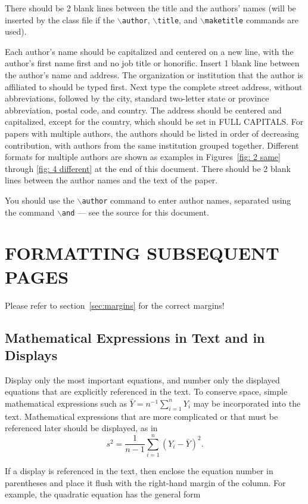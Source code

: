 \documentclass{wscpaperproc}
\theoremstyle{wsc}
\begin{document}
There should be 2 blank lines between the title and the authors' names (will be inserted by the class file if the {\tt $\backslash$author}, {\tt $\backslash$title}, and {\tt $\backslash$maketitle} commands are used).

Each author's name should be capitalized and centered on a new line, with the author's first name first and no job title or honorific.
Insert 1 blank line between the author's name and address. The organization or institution that the author is affiliated to should be typed first.
Next type the complete street address, without abbreviations, followed by the city, standard two-letter state or province abbreviation, postal code, and country.
The address should be centered and capitalized, except for the country, which should be set in FULL CAPITALS.
For papers with multiple authors, the authors should be listed in order of decreasing contribution, with authors from the same institution grouped together.
Different formats for multiple authors are shown as examples in Figures~\ref{fig: 2 same} through \ref{fig: 4 different} at the end of this document.
There should be 2 blank lines between the author names and the text of the paper.

You should use the {\tt $\backslash$author} command to enter author names, separated using the command {\tt $\backslash$and} --- see the source for this document.

\section{FORMATTING SUBSEQUENT PAGES}
Please refer to section~\ref{sec:margins} for the correct margins!

\subsection{Mathematical Expressions in Text and in Displays}
Display only the most important equations, and number only the displayed equations that are explicitly referenced in the text.
To conserve space, simple mathematical expressions such as $\bar Y = n^{-1} \sum_{i=1}^n Y_i$ may be incorporated into the text.
Mathematical expressions that are more complicated or that must be referenced later should be displayed, as in
$$s^2 = \frac 1 {n-1} \sum_{i=1}^n (Y_i - \bar Y)^2.$$

If a display is referenced in the text, then enclose the equation number in parentheses and place it flush with the right-hand margin of the
column. For example, the quadratic equation has the general form
\end{document}
